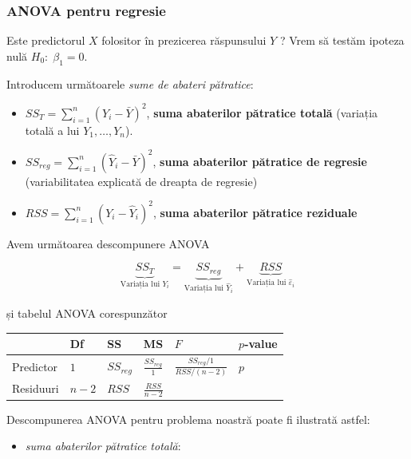 \documentclass[]{article}
\providecommand{\tightlist}{%
  \setlength{\itemsep}{0pt}\setlength{\parskip}{0pt}}
\begin{document}
\subsubsection{ANOVA pentru regresie}\label{anova-pentru-regresie}

Este predictorul \(X\) folositor în prezicerea răspunsului \(Y\) ? Vrem
să testăm ipoteza nulă \(H_0:\;\beta_1=0\).

Introducem următoarele \emph{sume de abateri pătratice}:

\begin{itemize}
\tightlist
\item
  \(SS_T=\sum_{i=1}^n\left(Y_i-\bar Y\right)^2\), \textbf{suma
  abaterilor pătratice totală} (variația totală a lui
  \(Y_1,\ldots,Y_n\)).
\item
  \(SS_{reg}=\sum_{i=1}^n\left(\hat Y_i-\bar Y\right)^2\), \textbf{suma
  abaterilor pătratice de regresie} (variabilitatea explicată de dreapta
  de regresie)
\item
  \(RSS=\sum_{i=1}^n\left(Y_i-\hat Y_i\right)^2\), \textbf{suma
  abaterilor pătratice reziduale}
\end{itemize}

Avem următoarea descompunere ANOVA

\[
\underbrace{SS_T}_{\text{Variația lui }Y_i} = \underbrace{SS_{reg}}_{\text{Variația lui }\hat Y_i} + \underbrace{RSS}_{\text{Variația lui }\hat \varepsilon_i} 
\]

și tabelul ANOVA corespunzător

\begin{longtable}[]{@{}llllll@{}}
\toprule
& Df & SS & MS & \(F\) & \(p\)-value\tabularnewline
\midrule
\endhead
Predictor & \(1\) & \(SS_{reg}\) & \(\frac{SS_{reg}}{1}\) &
\(\frac{SS_{reg}/1}{RSS/(n-2)}\) & \(p\)\tabularnewline
Residuuri & \(n - 2\) & \(RSS\) & \(\frac{RSS}{n-2}\) & &\tabularnewline
\bottomrule
\end{longtable}

Descompunerea ANOVA pentru problema noastră poate fi ilustrată astfel:

\begin{itemize}
\tightlist
\item
  \emph{suma abaterilor pătratice totală}:
\end{itemize}
\end{document}

